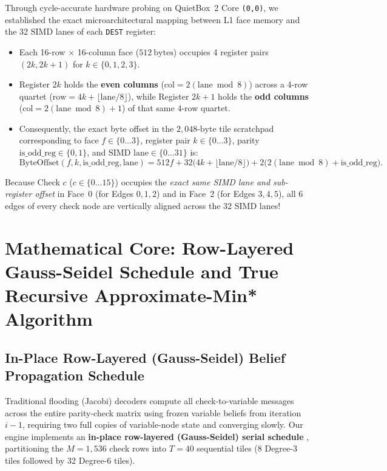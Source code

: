 \documentclass[10pt]{article}
\begin{document}
Through cycle-accurate hardware probing on QuietBox~2 Core \texttt{(0,0)}, we established the exact microarchitectural mapping between L1 face memory and the 32 SIMD lanes of each \texttt{DEST} register:
\begin{itemize}[leftmargin=1.8em, itemsep=2pt]
    \item Each 16-row $\times$ 16-column face ($512\ \mathrm{bytes}$) occupies 4 register pairs $(2k, 2k+1)$ for $k \in \{0, 1, 2, 3\}$.
    \item Register $2k$ holds the \textbf{even columns} ($\mathrm{col} = 2(\mathrm{lane} \bmod 8)$) across a 4-row quartet ($\mathrm{row} = 4k + \lfloor \mathrm{lane}/8 \rfloor$), while Register $2k+1$ holds the \textbf{odd columns} ($\mathrm{col} = 2(\mathrm{lane} \bmod 8) + 1$) of that same 4-row quartet.
    \item Consequently, the exact byte offset in the $2,048\text{-byte}$ tile scratchpad corresponding to face $f \in \{0 \dots 3\}$, register pair $k \in \{0 \dots 3\}$, parity $\mathrm{is\_odd\_reg} \in \{0, 1\}$, and SIMD $\mathrm{lane} \in \{0 \dots 31\}$ is:
    \begin{equation}
    \mathrm{ByteOffset}(f, k, \mathrm{is\_odd\_reg}, \mathrm{lane}) = 512 f + 32\bigl(4k + \lfloor \mathrm{lane}/8 \rfloor\bigr) + 2\bigl(2(\mathrm{lane} \bmod 8) + \mathrm{is\_odd\_reg}\bigr).
    \label{eq:unpacker_mapping}
    \end{equation}
\end{itemize}
Because Check $c$ ($c \in \{0 \dots 15\}$) occupies the \emph{exact same SIMD lane and sub-register offset} in Face~0 (for Edges $0, 1, 2$) and in Face~2 (for Edges $3, 4, 5$), all 6 edges of every check node are vertically aligned across the 32 SIMD lanes!

\section{Mathematical Core: Row-Layered Gauss-Seidel Schedule and True Recursive Approximate-Min* Algorithm}
\label{sec:math_core}

\subsection{In-Place Row-Layered (Gauss-Seidel) Belief Propagation Schedule}

Traditional flooding (Jacobi) decoders compute all check-to-variable messages across the entire parity-check matrix using frozen variable beliefs from iteration $i-1$, requiring two full copies of variable-node state and converging slowly. Our engine implements an \textbf{in-place row-layered (Gauss-Seidel) serial schedule} \cite{hocevar_layered_decoding, sharon_litsyn_serial, marchand_boutillon_gauss_seidel}, partitioning the $M = 1,536$ check rows into $T = 40$ sequential tiles (8 Degree-3 tiles followed by 32 Degree-6 tiles).
\end{document}
